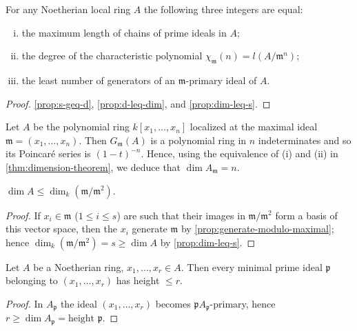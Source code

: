 \begin{theorem}\label{thm:dimension-theorem}
For any Noetherian local ring $A$ the following three integers are equal:
\begin{enumerate}[i)]
    \item the maximum length of chains of prime ideals in $A$;
    \item the degree of the characteristic polynomial $\chi_{\mathfrak{m}}(n) = l(A/\mathfrak{m}^n)$;
    \item the least number of generators of an $\mathfrak{m}$-primary ideal of $A$.
\end{enumerate}
\end{theorem}
\begin{proof}
    \eqref{prop:s-geq-d}, \eqref{prop:d-leq-dim}, and \eqref{prop:dim-leq-s}.
\end{proof}

\begin{example}
Let $A$ be the polynomial ring $k[x_1, \ldots, x_n]$ localized at the maximal ideal $\mathfrak{m} = (x_1, \ldots, x_n)$. Then $G_{\mathfrak{m}}(A)$ is a polynomial ring in $n$ indeterminates and so its Poincar\'e series is $(1 - t)^{-n}$. Hence, using the equivalence of (i) and (ii) in \ref{thm:dimension-theorem}, we deduce that $\dim A_{\mathfrak{m}} = n$.
\end{example}

\begin{corollary}\label{cor:dim-leq-embedding}
$\dim A \leq \dim_k(\mathfrak{m}/\mathfrak{m}^2)$.
\end{corollary}

\begin{proof}
If $x_i \in \mathfrak{m}$ ($1 \leq i \leq s$) are such that their images in $\mathfrak{m}/\mathfrak{m}^2$ form a basis of this vector space, then the $x_i$ generate $\mathfrak{m}$ by \eqref{prop:generate-modulo-maximal}; hence $\dim_k(\mathfrak{m}/\mathfrak{m}^2) = s \geq \dim A$ by \eqref{prop:dim-leq-s}.
\end{proof}

\begin{corollary}\label{cor:minimal-prime-height}
Let $A$ be a Noetherian ring, $x_1, \ldots, x_r \in A$. Then every minimal prime ideal $\mathfrak{p}$ belonging to $(x_1, \ldots, x_r)$ has height $\leq r$.
\end{corollary}

\begin{proof}
In $A_{\mathfrak{p}}$ the ideal $(x_1, \ldots, x_r)$ becomes $\mathfrak{p}A_{\mathfrak{p}}$-primary, hence $r \geq \dim A_{\mathfrak{p}} = \text{height } \mathfrak{p}$.
\end{proof}

